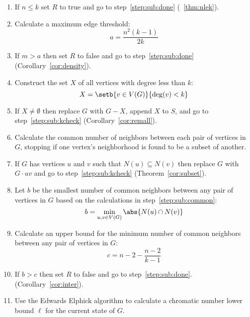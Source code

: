 \begin{enumerate}
\item\label{step:sub:kcheck} If \(n\le k\) set \(R\) to true and go to step~\ref{step:sub:done}
  (\theoremname~\ref{thm:nlek}).

\item\label{step:sub:ecalc} Calculate a maximum edge threshold:
  \[a=\frac{n^2(k-1)}{2k}\]

\item\label{step:sub:echeck} If \(m>a\) then set \(R\) to false and go to step~\ref{step:sub:done}
  (Corollary~\ref{cor:density}).

\item\label{step:sub:xcalc} Construct the set \(X\) of all vertices with degree less than \(k\):
  \[X=\setb{v\in V(G)}{\deg(v)<k}\]

\item\label{step:sub:xcheck} If \(X\ne\emptyset\) then replace \(G\) with \(G-X\), append \(X\) to \(S\), and go to
  step~\ref{step:sub:kcheck} (Corollary~\ref{cor:remall}).

\item\label{step:sub:common} Calculate the common number of neighbors between each pair of vertices in \(G\),
  stopping if one vertex's neighborhood is found to be a subset of another.

\item\label{step:sub:subset} If \(G\) has vertices \(u\) and \(v\) such that \(N(u)\subseteq N(v)\) then replace
  \(G\) with \(G\cdot uv\) and go to step~\ref{step:sub:kcheck} (Theorem~\ref{cor:subset}).

\item\label{step:sub:select} Let \(b\) be the smallest number of common neighbors between any pair of vertices in
  \(G\) based on the calculations in step~\ref{step:sub:common}:
  \[b=\min_{u,v\in V(G)}\abs{N(u)\cap N(v)}\]

\item\label{step:sub:ubcalc} Calculate an upper bound for the minimum number of common neighbors between any pair
  of vertices in \(G\):
  \[c=n-2-\frac{n-2}{k-1}\]

\item\label{step:sub:ubcheck} If \(b>c\) then set \(R\) to false and go to step~\ref{step:sub:done}.
  (Corollary~\ref{cor:inter}).

\item\label{step:sub:lower} Use the Edwards Elphick algorithm to calculate a chromatic number lower bound \(\ell\)
  for the current state of \(G\).


\end{enumerate}
